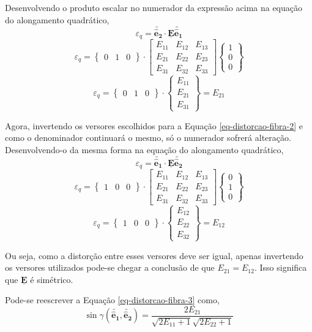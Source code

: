 Desenvolvendo o produto escalar no numerador da expressão acima na equação do alongamento quadrático,
\[\varepsilon_q=\utilde{\mathbf{\hat{e}_2}}\cdot\underline{\mathbf{E}}\utilde{\mathbf{\hat{e}_1}}\]
\[
	\varepsilon_q
	=
	\begin{Bmatrix}
		0 & 1 & 0
	\end{Bmatrix}
	\cdot
	\begin{bmatrix}
		E_{11} & E_{12} & E_{13} \\
		E_{21} & E_{22} & E_{23} \\
		E_{31} & E_{32} & E_{33}
	\end{bmatrix}
	\begin{Bmatrix}
		1 \\ 0 \\ 0
	\end{Bmatrix}
\]
\[
	\varepsilon_q
	=
	\begin{Bmatrix}
		0 & 1 & 0
	\end{Bmatrix}
	\cdot
	\begin{Bmatrix}
		E_{11} \\ E_{21} \\ E_{31}
	\end{Bmatrix}
	=
	E_{21}	
\]

Agora, invertendo os versores escolhidos para a Equação \eqref{eq-distorcao-fibra-2} e como o denominador continuará o mesmo, só o numerador sofrerá alteração. Desenvolvendo-o da mesma forma na equação do alongamento quadrático,
\[\varepsilon_q=\utilde{\mathbf{\hat{e}_1}}\cdot\underline{\mathbf{E}}\utilde{\mathbf{\hat{e}_2}}\]
\[
	\varepsilon_q
	=
	\begin{Bmatrix}
		1 & 0 & 0
	\end{Bmatrix}
	\cdot
	\begin{bmatrix}
		E_{11} & E_{12} & E_{13} \\
		E_{21} & E_{22} & E_{23} \\
		E_{31} & E_{32} & E_{33}
	\end{bmatrix}
	\begin{Bmatrix}
		0 \\ 1 \\ 0
	\end{Bmatrix}
\]
\[
	\varepsilon_q
	=
	\begin{Bmatrix}
		1 & 0 & 0
	\end{Bmatrix}
	\cdot
	\begin{Bmatrix}
		E_{12} \\ E_{22} \\ E_{32}
	\end{Bmatrix}
	=
	E_{12}
\]

Ou seja, como a distorção entre esses versores deve ser igual, apenas invertendo os versores utilizados pode-se chegar a conclusão de que $E_{21}=E_{12}$. Isso significa que $\underline{\mathbf{E}}$ é simétrico.

Pode-se reescrever a Equação \eqref{eq-distorcao-fibra-3} como,
\[\sin\gamma(\utilde{\mathbf{\hat{e}_1}},\utilde{\mathbf{\hat{e}_2}})=\frac{2E_{21}}{\displaystyle\sqrt{2E_{11}+1}\sqrt{2E_{22}+1}}\]